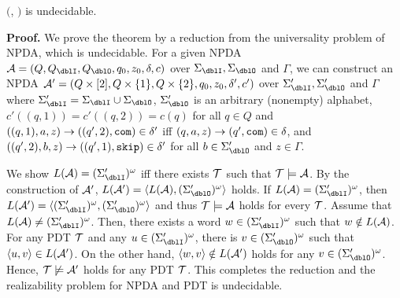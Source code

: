 \begin{theorem}
\label{th: NPDA-PDT}
\Real $($\NPDA, \PDT$)$ is undecidable.
\end{theorem}
{\bf Proof.}\quad
We prove the theorem by a reduction from the universality problem of NPDA, which is undecidable.
For a given NPDA $\calA = (Q, Q_\dblI, Q_\dblO, q_0, z_0, \delta, c)$ over $\Sigma_\dblI, \Sigma_\dblO$ and $\Gamma$,
we can construct an NPDA ${\cal A}' = (Q\times[2], Q\times\{1\}, Q\times\{2\}, q_0, z_0, \delta',c')$ over $\Sigma'_\dblI, \Sigma'_\dblO$ and $\Gamma$
where $\Sigma'_\dblI = \Sigma_\dblI\cup \Sigma_\dblO$,
$\Sigma'_\dblO$ is an arbitrary (nonempty) alphabet,
$c'((q,1))=c'((q,2))=c(q)$ for all $q\in Q$
and
$((q,1),a,z)\to ((q',2),\mathtt{com})\in\delta'$ iff $(q,a,z)\to (q',\mathtt{com})\in\delta$, and
$((q',2),b,z)\to ((q',1),\mathtt{skip})\in\delta'$ for all $b\in \Sigma'_\dblO$ and $z\in \Gamma$.

We show $L(\calA)=(\Sigma'_\dblI)^\omega$ iff there exists ${\cal T}$ such that ${\cal T}\models{\cal A}$.
By the construction of ${\cal A}'$, $L(\calA')=\<L(\calA),(\Sigma'_\dblO)^\omega\>$ holds.
If $L(\calA)=(\Sigma'_\dblI)^\omega$, then $L(\calA')=\<(\Sigma'_\dblI)^\omega,(\Sigma'_\dblO)^\omega\>$
and thus ${\cal T}\models{\cal A}$ holds for every ${\cal T}$.
Assume that $L(\calA)\neq(\Sigma'_\dblI)^\omega$.
Then, there exists a word $w\in(\Sigma'_\dblI)^\omega$ such that $w\notin L({\cal A})$.
For any PDT ${\cal T}$ and any $u\in(\Sigma'_\dblI)^\omega$, there is $v\in(\Sigma'_\dblO)^\omega$ such that $\langle u, v\rangle\in L({\cal A}')$.
On the other hand, $\langle w, v\rangle\notin L({\cal A}')$ holds for any $v\in(\Sigma'_\dblO)^\omega$.
Hence, ${\cal T}\not\models{\cal A}'$ holds for any PDT ${\cal T}$.
This completes the reduction and the realizability problem for NPDA and PDT is undecidable.

